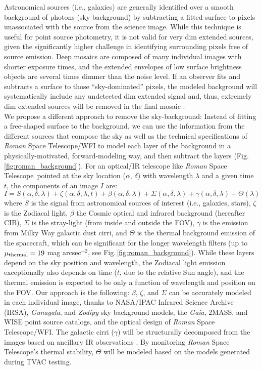 \documentclass{iau}
\newcommand{\magarc}{mag arcsec\ensuremath{^{\mathrm{-2}}}}
\newcommand{\RST}{\emph{Roman} Space Telescope}
\begin{document}
Astronomical sources (i.e., galaxies) are generally identified over a smooth background of photons (sky background) by subtracting a fitted surface to pixels unassociated with the source from the science image. While this technique is useful for point source photometry, it is not valid for very dim extended sources, given the significantly higher challenge in identifying surrounding pixels free of source emission. Deep mosaics are composed of many individual images with shorter exposure times, and the extended envelopes of low surface brightness objects are several times dimmer than the noise level. If an observer fits and subtracts a surface to those ``sky-dominated'' pixels, the modeled background will systematically include any undetected dim extended signal and, thus, extremely dim extended sources will be removed in the final mosaic \citep{akhlaghi+2015apj220_1}.\\


We propose a different approach to remove the sky-background: Instead of fitting a free-shaped surface to the background, we can use the information from the different sources that compose the sky as well as the technical specifications of \RST/WFI to model each layer of the background in a physically-motivated, forward-modeling way, and then subtract the layers (Fig.\,\ref{fig:roman_background}). For an optical/IR telescope like \RST\ pointed at the sky location ($\alpha$, $\delta$) with wavelength $\lambda$ and a given time $t$, the components of an image $I$ are:
\begin{equation}
    I = S(\alpha, \delta, \lambda) + \zeta(\alpha, \delta, \lambda, t) + \beta(\alpha, \delta, \lambda) + \Sigma(\alpha, \delta, \lambda) + \gamma(\alpha, \delta, \lambda) + \Theta(\lambda)
\label{eq:background}
\end{equation}
where $S$ is the signal from astronomical sources of interest (i.e., galaxies, stars), $\zeta$ is the Zodiacal light, $\beta$ the Cosmic optical and infrared background (hereafter CIB), $\Sigma$ is the stray-light (from inside and outside the FOV), $\gamma$ is the emission from Milky Way galactic dust cirri, and $\Theta$ is the thermal background emission of the spacecraft, which can be significant for the longer wavelength filters (up to $\mu_{\rm{thermal}}=19$ \magarc, see Fig.\,\ref{fig:roman_background}). While these layers depend on the sky position and wavelength, the Zodiacal light emission exceptionally also depends on time ($t$, due to the relative Sun angle), and the thermal emission is expected to be only a function of wavelength and position on the FOV. Our approach is the following: $\beta$, $\zeta$, and $\Sigma$ can be accurately modeled in each individual image, thanks to NASA/IPAC Infrared Science Archive (IRSA), \emph{Gunagala}, and \emph{Zodipy} sky background models, the \emph{Gaia}, 2MASS, and WISE point source catalogs, and the optical design of \RST/WFI. The galactic cirri ($\gamma$) will be structurally decomposed from the images based on ancillary IR observations \citep[][Sanchez-Alarcón et al. in prep.]{2025ApJ...979..175L}. By monitoring \RST's thermal stability,  $\Theta$ will be modeled based on the models generated during TVAC testing.
\end{document}
